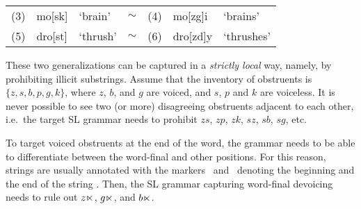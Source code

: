 \medskip
\begin{tabular}{lllclll}
(3) & mo[sk] & `brain' & $\sim$ & (4) & mo[zg]i & `brains' \\
(5) & dro[st] & `thrush' & $\sim$ & (6) & dro[zd]y & `thrushes'
\end{tabular}
\medskip

These two generalizations can be captured in a \emph{strictly local} way, namely, by prohibiting illicit substrings.
Assume that the inventory of obstruents is $\{z, s, b, p, g, k\}$, where $z$, $b$, and $g$ are voiced, and $s$, $p$ and $k$ are voiceless.
It is never possible to see two (or more) disagreeing obstruents adjacent to each other, i.e.\ the target SL grammar needs to prohibit $zs$, $zp$, $zk$, $sz$, $sb$, $sg$, etc.


To target voiced obstruents at the end of the word, the grammar needs to be able to differentiate between the word-final and other positions.
For this reason, strings are usually annotated with the markers \bow\ and \eow\ denoting the beginning and the end of the string \citep{RogersPullum2011}.
Then, the SL grammar capturing word-final devoicing needs to rule out $z\ltimes$,  $g\ltimes$, and $b\ltimes$.

